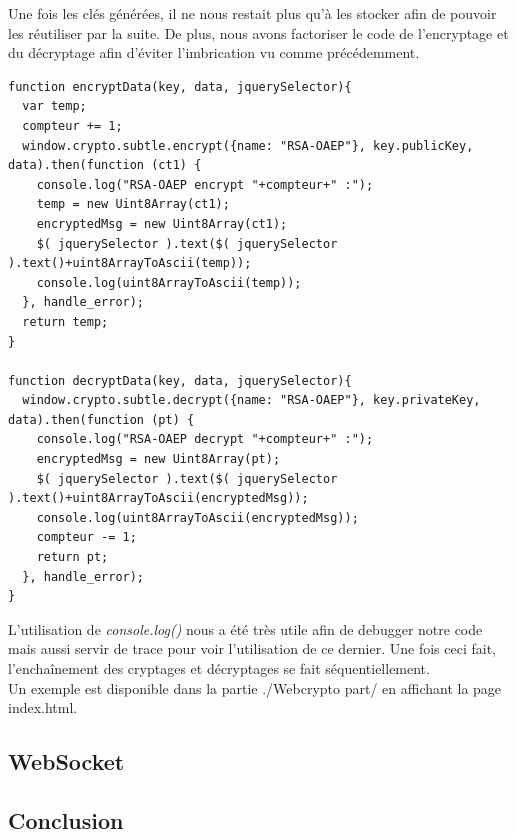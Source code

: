\documentclass[a4paper,12pt]{report}
\begin{document}
	Une fois les clés générées, il ne nous restait plus qu'à les stocker afin de pouvoir les réutiliser par la suite. De plus, nous avons factoriser le code de l'encryptage et du décryptage afin d'éviter l'imbrication vu comme précédemment. 
		\begin{lstlisting}
function encryptData(key, data, jquerySelector){
  var temp;
  compteur += 1;
  window.crypto.subtle.encrypt({name: "RSA-OAEP"}, key.publicKey, data).then(function (ct1) {
    console.log("RSA-OAEP encrypt "+compteur+" :");
    temp = new Uint8Array(ct1);
    encryptedMsg = new Uint8Array(ct1);
    $( jquerySelector ).text($( jquerySelector ).text()+uint8ArrayToAscii(temp));
    console.log(uint8ArrayToAscii(temp));
  }, handle_error);
  return temp;
}

function decryptData(key, data, jquerySelector){
  window.crypto.subtle.decrypt({name: "RSA-OAEP"}, key.privateKey, data).then(function (pt) {
    console.log("RSA-OAEP decrypt "+compteur+" :");
    encryptedMsg = new Uint8Array(pt);
    $( jquerySelector ).text($( jquerySelector ).text()+uint8ArrayToAscii(encryptedMsg));
    console.log(uint8ArrayToAscii(encryptedMsg));
    compteur -= 1;
    return pt;
  }, handle_error);
}	
	\end{lstlisting}
	L'utilisation de \textit{console.log()} nous a été très utile afin de debugger notre code mais aussi servir de trace pour voir l'utilisation de ce dernier. Une fois ceci fait, l'enchaînement des cryptages et décryptages se fait séquentiellement.\\
	Un exemple est disponible dans la partie ./Webcrypto part/ en affichant la page index.html.
	\subsection{WebSocket}

\newpage	
\begin{center}
\section*{Conclusion}
\end{center}
\end{document}
